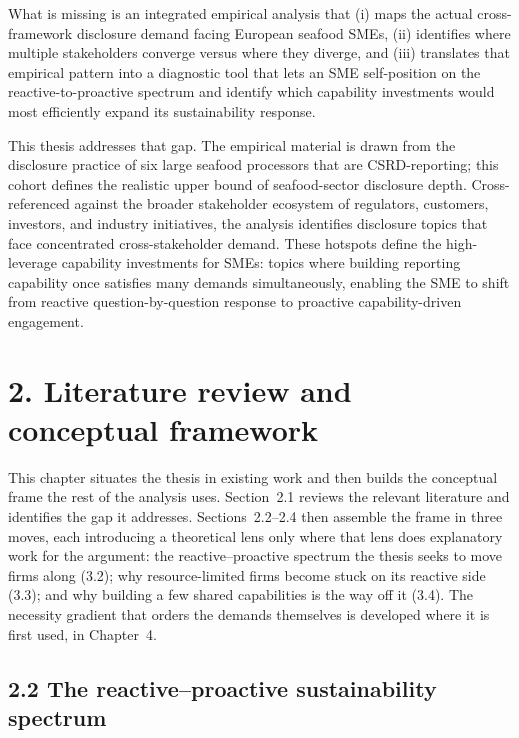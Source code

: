 \documentclass[
]{article}
\begin{document}
What is missing is an integrated empirical analysis that (i) maps the
actual cross-framework disclosure demand facing European seafood SMEs,
(ii) identifies where multiple stakeholders converge versus where they
diverge, and (iii) translates that empirical pattern into a diagnostic
tool that lets an SME self-position on the reactive-to-proactive
spectrum and identify which capability investments would most
efficiently expand its sustainability response.

This thesis addresses that gap. The empirical material is drawn from the
disclosure practice of six large seafood processors that are
CSRD-reporting; this cohort defines the realistic upper bound of
seafood-sector disclosure depth. Cross-referenced against the broader
stakeholder ecosystem of regulators, customers, investors, and industry
initiatives, the analysis identifies disclosure topics that face
concentrated cross-stakeholder demand. These hotspots define the
high-leverage capability investments for SMEs: topics where building
reporting capability once satisfies many demands simultaneously,
enabling the SME to shift from reactive question-by-question response to
proactive capability-driven engagement.
\fi %



\section{2. Literature review and conceptual framework}\label{conceptual-framework}

This chapter situates the thesis in existing work and then builds the conceptual
frame the rest of the analysis uses. Section~2.1 reviews the relevant literature
and identifies the gap it addresses. Sections~2.2--2.4 then assemble the frame in
three moves, each introducing a theoretical lens only where that lens does
explanatory work for the argument: the reactive--proactive spectrum the thesis
seeks to move firms along (3.2); why resource-limited firms become stuck on its
reactive side (3.3); and why building a few shared capabilities is the way off it
(3.4). The necessity gradient that orders the demands themselves is developed
where it is first used, in Chapter~4.



\subsection{2.2 The reactive--proactive sustainability
spectrum}\label{the-reactive-proactive-sustainability-spectrum}
\end{document}
